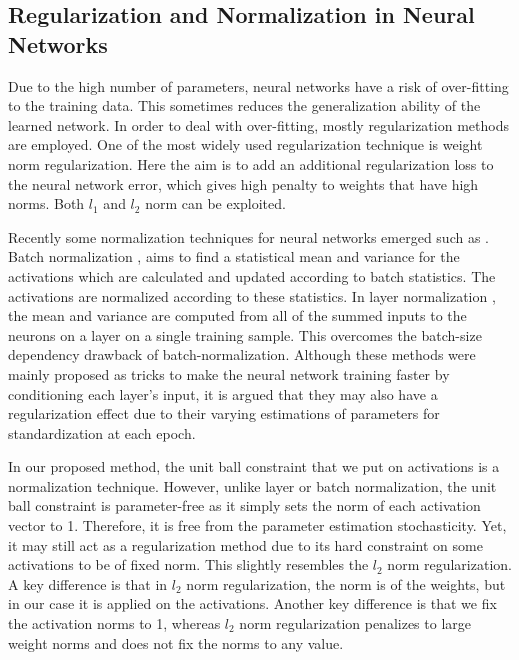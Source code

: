 \documentclass[conference]{IEEEtran}
\begin{document}
\subsection{Regularization and Normalization in Neural Networks}

Due to the high number of parameters, neural networks have a risk of over-fitting to the training data. 
This sometimes reduces the generalization ability of the learned network.
In order to deal with over-fitting, mostly regularization methods are employed.
One of the most widely used regularization technique is weight norm regularization. 
Here the aim is to add an additional regularization loss to the neural network error, which gives high penalty to weights that have high norms.
Both $l_1$ and $l_2$ norm can be exploited.

Recently some normalization techniques for neural networks emerged such as \cite{BNORM, LNORM}.
Batch normalization \cite{BNORM}, aims to find a statistical mean and variance for the activations which are calculated and updated according to batch statistics.
The activations are normalized according to these statistics.
In layer normalization \cite{LNORM}, the mean and variance are computed from all of the summed inputs to the neurons on a layer on a single training sample. 
This overcomes the batch-size dependency drawback of batch-normalization.
Although these methods were mainly proposed as tricks to make the neural network training faster by conditioning each layer's input, it is argued that they may also have a regularization effect due to their varying estimations of parameters for standardization at each epoch.

In our proposed method, the unit ball constraint that we put on activations is a normalization technique.
However, unlike layer or batch normalization, the unit ball constraint is parameter-free as it simply sets the norm of each activation vector to 1.
Therefore, it is free from the parameter estimation stochasticity.
Yet, it may still act as a regularization method due to its hard constraint on some activations to be of fixed norm.
This slightly resembles the $l_2$ norm regularization.
A key difference is that in $l_2$ norm regularization, the norm is of the weights, but in our case it is applied on the activations.
Another key difference is that we fix the activation norms to 1, whereas $l_2$ norm regularization penalizes to large weight norms and does not fix the norms to any value.
\end{document}
